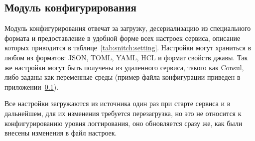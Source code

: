 \subsection{Модуль конфигурирования}

Модуль конфигурирования отвечат за загрузку, десериализацию из специального формата
и предоставление в удобной форме всех настроек сервиса, описание которых приводится в таблице~\ref{tab:snitch:setting}.
Настройки могут храниться в любом из форматов: JSON, TOML, YAML, HCL и формат свойств джавы.
Так же настройки могут быть получены из удаленного сервиса, такого как Consul\@,
либо заданы как переменные среды (пример файла конфигурации приведен в приложении~\ref{}).

Все настройки загружаются из источника один раз при старте сервиса и в дальнейшем,
для их изменения требуется перезагрузка,
но это не относится к конфигурированию уровня логгирования,
оно обновляется сразу же, как были внесены изменения в файл настроек.

